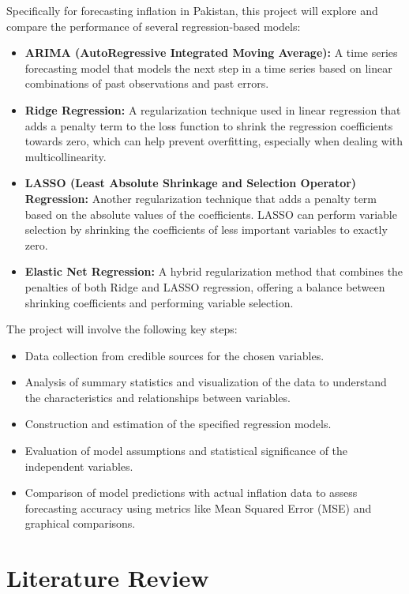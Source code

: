\documentclass[12pt,a4paper]{article}
\begin{document}
Specifically for forecasting inflation in Pakistan, this project will explore and compare the performance of several regression-based models:
\begin{itemize}
    \item \textbf{ARIMA (AutoRegressive Integrated Moving Average):} A time series forecasting model that models the next step in a time series based on linear combinations of past observations and past errors.
    \item \textbf{Ridge Regression:} A regularization technique used in linear regression that adds a penalty term to the loss function to shrink the regression coefficients towards zero, which can help prevent overfitting, especially when dealing with multicollinearity.
    \item \textbf{LASSO (Least Absolute Shrinkage and Selection Operator) Regression:} Another regularization technique that adds a penalty term based on the absolute values of the coefficients. LASSO can perform variable selection by shrinking the coefficients of less important variables to exactly zero.
    \item \textbf{Elastic Net Regression:} A hybrid regularization method that combines the penalties of both Ridge and LASSO regression, offering a balance between shrinking coefficients and performing variable selection.
\end{itemize}
The project will involve the following key steps:
\begin{itemize}
    \item Data collection from credible sources for the chosen variables.
    \item Analysis of summary statistics and visualization of the data to understand the characteristics and relationships between variables.
    \item Construction and estimation of the specified regression models.
    \item Evaluation of model assumptions and statistical significance of the independent variables.
    \item Comparison of model predictions with actual inflation data to assess forecasting accuracy using metrics like Mean Squared Error (MSE) and graphical comparisons.
\end{itemize}
\section{Literature Review}
\end{document}

